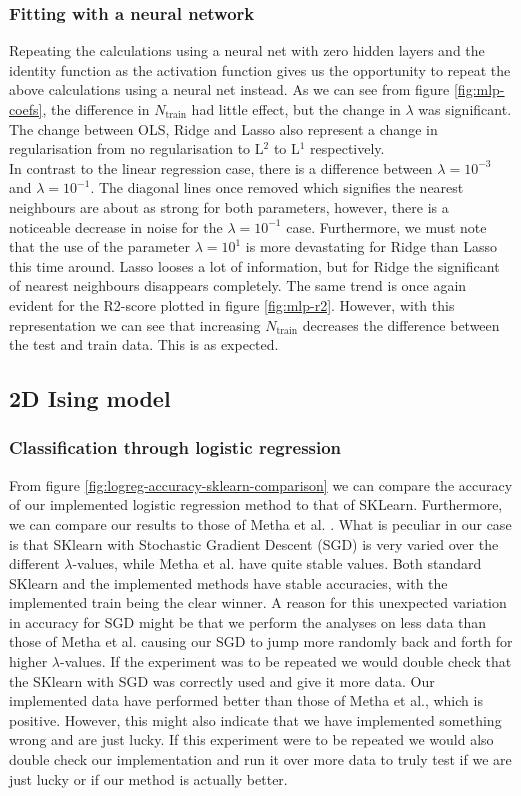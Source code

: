 \documentclass[11pt]{article}
\begin{document}
\subsubsection{Fitting with a neural network}
Repeating the calculations using a neural net with zero hidden layers and the identity function as the activation function gives us the opportunity to repeat the above calculations using a neural net instead. As we can see from figure \ref{fig:mlp-coefs}, the difference in $N_{\text{train}}$ had little effect, but the change in $\lambda$ was significant. The change between OLS, Ridge and Lasso also represent a change in regularisation from no regularisation to L$^2$ to L$^1$ respectively. \\
In contrast to the linear regression case, there is a difference between $\lambda = 10^{-3}$ and $\lambda = 10^{-1}$. The diagonal lines once removed which signifies the nearest neighbours are about as strong for both parameters, however, there is a noticeable decrease in noise for the $\lambda = 10^{-1}$ case. Furthermore, we must note that the use of the parameter $\lambda = 10^{1}$ is more devastating for Ridge than Lasso this time around. Lasso looses a lot of information, but for Ridge the significant of nearest neighbours disappears completely. The same trend is once again evident for the R2-score plotted in figure \ref{fig:mlp-r2}. However, with this representation we can see that increasing $N_{\text{train}}$ decreases the difference between the test and train data. This is as expected.
\subsection{2D Ising model}
\subsubsection{Classification through logistic regression}
From figure \ref{fig:logreg-accuracy-sklearn-comparison} we can compare the accuracy of our implemented logistic regression method to that of SKLearn. Furthermore, we can compare our results to those of Metha et al. \cite{2018arXiv180308823M}. What is peculiar in our case is that SKlearn with Stochastic Gradient Descent (SGD) is very varied over the different $\lambda$-values, while Metha et al. have quite stable values. Both standard SKlearn and the implemented methods have stable accuracies, with the implemented train being the clear winner. A reason for this unexpected variation in accuracy for SGD might be that we perform the analyses on less data than those of Metha et al. causing our SGD to jump more randomly back and forth for higher $\lambda$-values. If the experiment was to be repeated we would double check that the SKlearn with SGD was correctly used and give it more data. Our implemented data have performed better than those of Metha et al., which is positive. However, this might also indicate that we have implemented something wrong and are just lucky. If this experiment were to be repeated we would also double check our implementation and run it over more data to truly test if we are just lucky or if our method is actually better.
\end{document}
